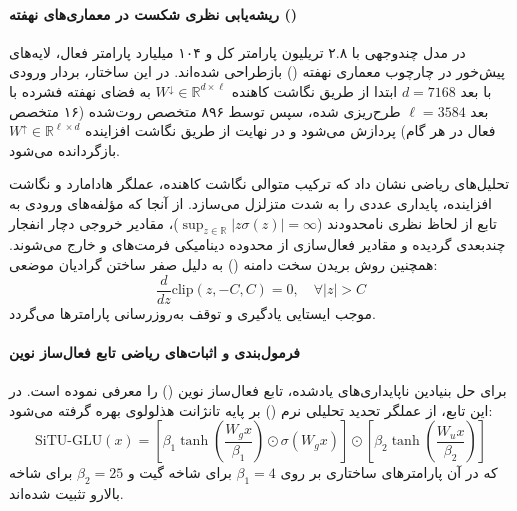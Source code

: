 \item {}

\paragraph*{ریشه‌یابی نظری شکست  در معماری‌های نهفته ()}
در مدل چندوجهی  \cite{kimi2025k3} با ۲.۸ تریلیون پارامتر کل و ۱۰۴ میلیارد پارامتر فعال، لایه‌های پیش‌خور در چارچوب معماری نهفته () بازطراحی شده‌اند. در این ساختار، بردار ورودی با بعد $d = 7168$ ابتدا از طریق نگاشت کاهنده $W^\downarrow \in \mathbb{R}^{d \times \ell}$ به فضای نهفته فشرده با بعد $\ell = 3584$ طرح‌ریزی شده، سپس توسط ۸۹۶ متخصص روت‌شده (۱۶ متخصص فعال در هر گام) پردازش می‌شود و در نهایت از طریق نگاشت افزاینده $W^\uparrow \in \mathbb{R}^{\ell \times d}$ بازگردانده می‌شود. 

تحلیل‌های ریاضی  نشان داد که ترکیب متوالی نگاشت کاهنده، عملگر هادامارد و نگاشت افزاینده، پایداری عددی  را به شدت متزلزل می‌سازد. از آنجا که مؤلفه‌های ورودی به تابع  از لحاظ نظری نامحدودند ($\sup_{z \in \mathbb{R}} |z \sigma(z)| = \infty$)، مقادیر خروجی دچار انفجار چندبعدی گردیده و مقادیر فعال‌سازی از محدوده دینامیکی فرمت‌های  و  خارج می‌شوند. همچنین روش بریدن سخت دامنه () به دلیل صفر ساختن گرادیان موضعی:
\begin{equation}
    \frac{d}{dz}\text{clip}(z, -C, C) = 0, \quad \forall |z| > C
\end{equation}
موجب ایستایی یادگیری و توقف به‌روزرسانی پارامترها می‌گردد.

\paragraph*{فرمول‌بندی و اثبات‌های ریاضی تابع فعال‌ساز نوین }
برای حل بنیادین ناپایداری‌های یادشده،  تابع فعال‌ساز نوین  () را معرفی نموده است. در این تابع، از عملگر تحدید تحلیلی نرم () بر پایه تانژانت هذلولوی بهره گرفته می‌شود:
\begin{equation}
    \text{SiTU-GLU}(x) = \left[ \beta_1 \tanh\left(\frac{W_g x}{\beta_1}\right) \odot \sigma(W_g x) \right] \odot \left[ \beta_2 \tanh\left(\frac{W_u x}{\beta_2}\right) \right]
\end{equation}
که در آن پارامترهای ساختاری بر روی $\beta_1 = 4$ برای شاخه گیت و $\beta_2 = 25$ برای شاخه بالارو تثبیت شده‌اند.


